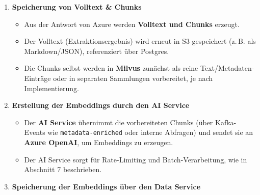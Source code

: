 \begin{enumerate}
  \begin{itemize}
  \tightlist
  \item
    Nachdem ein Dokument im S3 Storage liegt und der entsprechende
    Kafka-Event verarbeitet wurde, zieht der \textbf{Extraction Service}
    das Dokument aus S3.\\
  \item
    Der Extraction Service ruft \textbf{Azure Document Intelligence} auf
    und erhält strukturierten Volltext, Layoutinformationen und ggf.
    Tabellen.\\
  \item
    Nach erfolgreicher Extraktion wird der Status in Postgres
    aktualisiert (z.\,B. \texttt{EXTRACTED}), und ein Event
    \texttt{content-extracted} wird erzeugt.
  \end{itemize}
\item
  \textbf{Speicherung von Volltext \& Chunks}

  \begin{itemize}
  \tightlist
  \item
    Aus der Antwort von Azure werden \textbf{Volltext und Chunks}
    erzeugt.\\
  \item
    Der Volltext (Extraktionsergebnis) wird erneut in S3 gespeichert
    (z.\,B. als Markdown/JSON), referenziert über Postgres.\\
  \item
    Die Chunks selbst werden in \textbf{Milvus} zunächst als reine
    Text/Metadaten-Einträge oder in separaten Sammlungen vorbereitet, je
    nach Implementierung.
  \end{itemize}
\item
  \textbf{Erstellung der Embeddings durch den AI Service}

  \begin{itemize}
  \tightlist
  \item
    Der \textbf{AI Service} übernimmt die vorbereiteten Chunks (über
    Kafka-Events wie \texttt{metadata-enriched} oder interne Abfragen)
    und sendet sie an \textbf{Azure OpenAI}, um Embeddings zu
    erzeugen.\\
  \item
    Der AI Service sorgt für Rate-Limiting und Batch-Verarbeitung, wie
    in Abschnitt 7 beschrieben.
  \end{itemize}
\item
  \textbf{Speicherung der Embeddings über den Data Service}


\end{enumerate}
